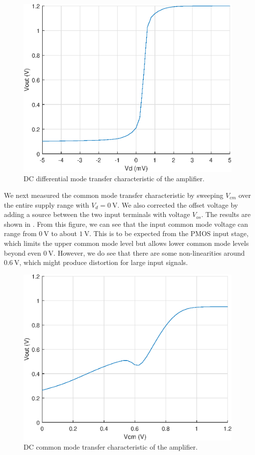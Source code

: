 \documentclass[journal,hidelinks]{IEEEtran}
\begin{document}
\begin{figure}[!htb]
  \centering
  \includegraphics[width=\columnwidth]{figures/dc_dm.eps}
  \caption{DC differential mode transfer characteristic of the amplifier.}
  \label{fig:dc_dm}
\end{figure}

We next measured the common mode transfer characteristic by sweeping $V_{cm}$ over the entire supply range with $V_d = \SI{0}{\volt}$. We also corrected the offset voltage by adding a source between the two input terminals with voltage $V_{os}$. The results are shown in . From this figure, we can see that the input common mode voltage can range from $\SI{0}{\volt}$ to about $\SI{1}{\volt}$. This is to be expected from the PMOS input stage, which limits the upper common mode level but allows lower common mode levels beyond even $\SI{0}{\volt}$. However, we do see that there are some non-linearities around $\SI{0.6}{\volt}$, which might produce distortion for large input signals.

\begin{figure}[!htb]
  \centering
  \includegraphics[width=\columnwidth]{figures/dc_cm.eps}
  \caption{DC common mode transfer characteristic of the amplifier.}
  \label{fig:dc_cm}
\end{figure}
\end{document}
